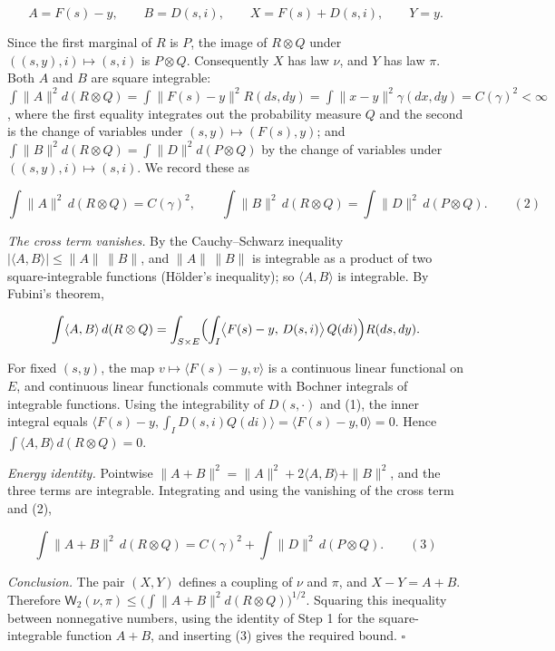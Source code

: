 \documentclass[11pt,a4paper]{article}
\begin{document}
\[A=F(s)-y,\qquad B=D(s,i),\qquad X=F(s)+D(s,i),\qquad Y=y.\]


Since the first marginal of \(R\) is \(P\), the image of \(R\otimes Q\) under \(((s,y),i)\mapsto(s,i)\) is \(P\otimes Q\). Consequently \(X\) has law \(\nu\), and \(Y\) has law \(\pi\). Both \(A\) and \(B\) are square integrable: \(\int\|A\|^2d(R\otimes Q)=\int\|F(s)-y\|^2R(ds,dy)=\int\|x-y\|^2\gamma(dx,dy)=C(\gamma)^2<\infty\), where the first equality integrates out the probability measure \(Q\) and the second is the change of variables under \((s,y)\mapsto(F(s),y)\); and \(\int\|B\|^2d(R\otimes Q)=\int\|D\|^2d(P\otimes Q)\) by the change of variables under \(((s,y),i)\mapsto(s,i)\). We record these as


\[\int\|A\|^2\,d(R\otimes Q)=C(\gamma)^2,\qquad\int\|B\|^2\,d(R\otimes Q)=\int\|D\|^2\,d(P\otimes Q).\qquad(2)\]


\emph{The cross term vanishes.} By the Cauchy–Schwarz inequality \(|\langle A,B\rangle|\le\|A\|\,\|B\|\), and \(\|A\|\,\|B\|\) is integrable as a product of two square-integrable functions (Hölder's inequality); so \(\langle A,B\rangle\) is integrable. By Fubini's theorem,


\[\int\langle A,B\rangle\,d(R\otimes Q)=\int_{S\times E}\Bigl(\int_I\bigl\langle F(s)-y,\,D(s,i)\bigr\rangle\,Q(di)\Bigr)R(ds,dy).\]


For fixed \((s,y)\), the map \(v\mapsto\langle F(s)-y,v\rangle\) is a continuous linear functional on \(E\), and continuous linear functionals commute with Bochner integrals of integrable functions. Using the integrability of \(D(s,\cdot)\) and (1), the inner integral equals \(\langle F(s)-y,\int_ID(s,i)Q(di)\rangle=\langle F(s)-y,0\rangle=0\). Hence \(\int\langle A,B\rangle\,d(R\otimes Q)=0\).




\emph{Energy identity.} Pointwise \(\|A+B\|^2=\|A\|^2+2\langle A,B\rangle+\|B\|^2\), and the three terms are integrable. Integrating and using the vanishing of the cross term and (2),


\[\int\|A+B\|^2\,d(R\otimes Q)=C(\gamma)^2+\int\|D\|^2\,d(P\otimes Q).\qquad(3)\]


\emph{Conclusion.} The pair \((X,Y)\) defines a coupling of \(\nu\) and \(\pi\), and \(X-Y=A+B\). Therefore \(\mathsf W_2(\nu,\pi)\le\bigl(\int\|A+B\|^2d(R\otimes Q)\bigr)^{1/2}\). Squaring this inequality between nonnegative numbers, using the identity of Step 1 for the square-integrable function \(A+B\), and inserting (3) gives the required bound. \(\square\)
\end{document}
